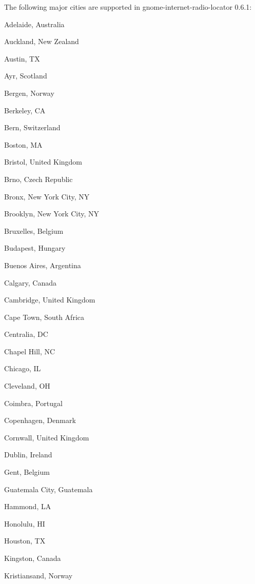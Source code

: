 \documentclass[20pt,landscape]{foils}
\begin{document}

The following major cities are supported in gnome-internet-radio-locator 0.6.1:

\begin{list1}
\item
  \begin{list2}
    \item Adelaide, Australia
    \item Auckland, New Zealand
    \item Austin, TX
    \item Ayr, Scotland
    \item Bergen, Norway
    \item Berkeley, CA
    \item Bern, Switzerland
    \item Boston, MA
    \item Bristol, United Kingdom
    \item Brno, Czech Republic
    \item Bronx, New York City, NY
    \item Brooklyn, New York City, NY
    \item Bruxelles, Belgium
    \item Budapest, Hungary
    \item Buenos Aires, Argentina
    \item Calgary, Canada
    \item Cambridge, United Kingdom
    \item Cape Town, South Africa
    \item Centralia, DC
    \item Chapel Hill, NC
    \item Chicago, IL
    \item Cleveland, OH
    \item Coimbra, Portugal
    \item Copenhagen, Denmark
    \item Cornwall, United Kingdom
    \item Dublin, Ireland
    \item Gent, Belgium
    \item Guatemala City, Guatemala
    \item Hammond, LA
    \item Honolulu, HI
    \item Houston, TX
    \item Kingston, Canada
    \item Kristiansand, Norway

\end{list2}
\end{list1}
\end{document}
